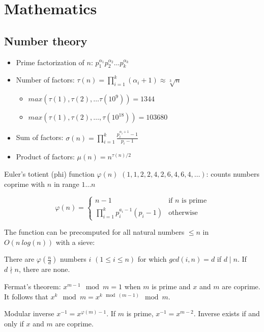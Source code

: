 \documentclass{article}
\newcommand{\divides}{\mid}
\newcommand{\notdivides}{\nmid}
\begin{document}


\section {Mathematics}

\subsection {Number theory}

\begin{itemize}
	\item Prime factorization of $n$: $p_1^{\alpha_1}p_2^{\alpha_2} \dots p_k^{\alpha_k}$
	\item Number of factors: $\tau(n) = \prod_{i=1}^{k} (\alpha_i+1) \approx \sqrt[3]n$
		\begin {itemize}
			\item $max(\tau(1), \tau(2), \dots \tau(10^9)) = 1344$
			\item $max(\tau(1), \tau(2), \dots, \tau(10^{18})) = 103680$
		\end {itemize}
	\item Sum of factors: $\sigma(n) = \prod_{i=1}^{k} \frac{p_i^{\alpha_i+1}-1}{p_i-1}$
	\item Product of factors: $\mu(n) = n^{\tau(n)/2}$
\end{itemize}

Euler's totient (phi) function $\varphi(n)$ $(1, 1, 2, 2, 4, 2, 6, 4, 6, 4, \dots)$: counts numbers coprime with $n$ in range $1 \dots n$

\[
	\varphi(n) =
	\begin{cases}
		n-1 &\text{if $n$ is prime} \\
		\prod_{i=1}^{k} p_i^{a_i-1}(p_i-1) &\text{otherwise}
	\end{cases}
\]

The function can be precomputed for all natural numbers $\leq n$ in $O(n\ log(n))$ with a sieve:



There are $\varphi(\frac{n}{d})$ numbers $i$ $(1 \leq i \leq n)$ for which $gcd(i, n) = d$ if $d \divides n$. If $d \notdivides n$, there are none.

Fermat's theorem: $x^{m-1} \mod m = 1$ when $m$ is prime and $x$ and $m$ are coprime. It follows that $x^k \mod m = x^{k \mod (m-1)} \mod m$.

Modular inverse $x^{-1} = x^{\varphi(m)-1}$. If $m$ is prime, $x^{-1} = x^{m-2}$. Inverse exists if and only if $x$ and $m$ are coprime.
\end{document}
